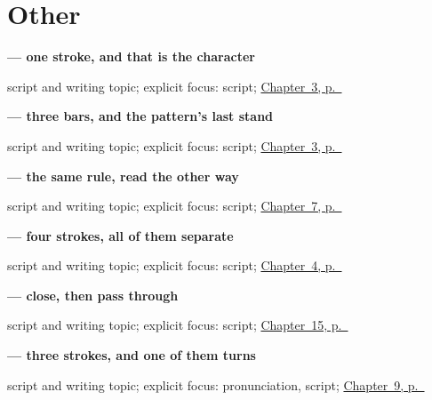 \section*{Other}

\noindent\begin{minipage}[t]{\linewidth}
\raggedright
\textbf{ — one stroke, and that is the character}\par
\footnotesize script and writing topic; explicit focus: script; \hyperref[ch:zh-numbers]{Chapter~3, p.~\pageref*{ch:zh-numbers}}
\end{minipage}\par\smallskip

\noindent\begin{minipage}[t]{\linewidth}
\raggedright
\textbf{ — three bars, and the pattern's last stand}\par
\footnotesize script and writing topic; explicit focus: script; \hyperref[ch:zh-numbers]{Chapter~3, p.~\pageref*{ch:zh-numbers}}
\end{minipage}\par\smallskip

\noindent\begin{minipage}[t]{\linewidth}
\raggedright
\textbf{ — the same rule, read the other way}\par
\footnotesize script and writing topic; explicit focus: script; \hyperref[ch:zh-zaoshang]{Chapter~7, p.~\pageref*{ch:zh-zaoshang}}
\end{minipage}\par\smallskip

\noindent\begin{minipage}[t]{\linewidth}
\raggedright
\textbf{ — four strokes, all of them separate}\par
\footnotesize script and writing topic; explicit focus: script; \hyperref[ch:zh-negation]{Chapter~4, p.~\pageref*{ch:zh-negation}}
\end{minipage}\par\smallskip

\noindent\begin{minipage}[t]{\linewidth}
\raggedright
\textbf{ — close, then pass through}\par
\footnotesize script and writing topic; explicit focus: script; \hyperref[ch:zh-school-compounds]{Chapter~15, p.~\pageref*{ch:zh-school-compounds}}
\end{minipage}\par\smallskip

\noindent\begin{minipage}[t]{\linewidth}
\raggedright
\textbf{ — three strokes, and one of them turns}\par
\footnotesize script and writing topic; explicit focus: pronunciation, script; \hyperref[ch:zh-shenme]{Chapter~9, p.~\pageref*{ch:zh-shenme}}
\end{minipage}\par\smallskip


